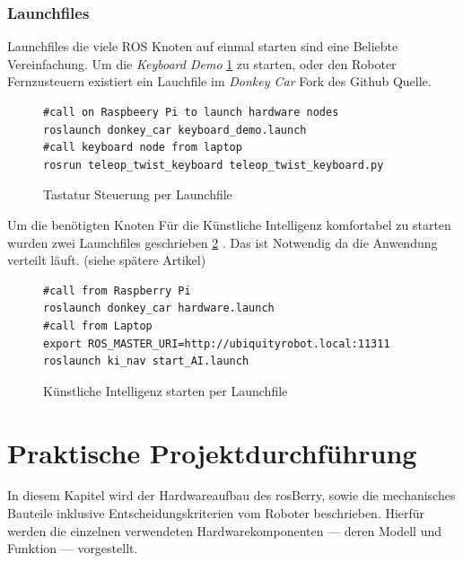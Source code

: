 \documentclass[conference]{IEEEtran}
\begin{document}
\subsubsection{Launchfiles}

Launchfiles die viele ROS Knoten auf einmal starten sind eine Beliebte 
Vereinfachung. Um die \textit{Keyboard Demo}  \ref{demo} zu starten, oder 
den Roboter Fernzusteuern existiert ein Lauchfile im \textit{Donkey Car} 
Fork 
des Github Quelle.
\begin{figure}
	\centering
	\begin{verbatim}
#call on Raspbeery Pi to launch hardware nodes
roslaunch donkey_car keyboard_demo.launch
#call keyboard node from laptop 
rosrun teleop_twist_keyboard teleop_twist_keyboard.py
	\end{verbatim}
	\label{demo}
	\caption{Tastatur Steuerung per Launchfile }
\end{figure}

Um die benötigten Knoten Für die Künstliche Intelligenz komfortabel zu 
starten wurden zwei Launchfiles geschrieben \ref{KI-launch} .  Das ist 
Notwendig da die 
Anwendung verteilt läuft. (siehe spätere Artikel)

\begin{figure}
	\centering
	\begin{verbatim}
#call from Raspberry Pi
roslaunch donkey_car hardware.launch
#call from Laptop
export ROS_MASTER_URI=http://ubiquityrobot.local:11311
roslaunch ki_nav start_AI.launch
	\end{verbatim}
	\label{KI-launch}
	\caption{Künstliche Intelligenz starten per Launchfile }
\end{figure}

\section{Praktische Projektdurchführung}


In diesem Kapitel wird der Hardwareaufbau des rosBerry, sowie die mechanisches Bauteile inklusive Entscheidungskriterien vom Roboter beschrieben. 
Hierfür werden die einzelnen verwendeten Hardwarekomponenten — deren Modell und Funktion — vorgestellt. 
\end{document}
